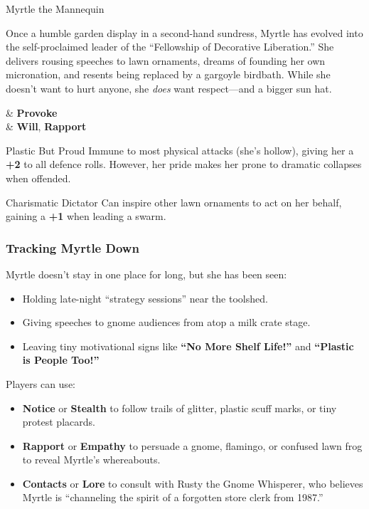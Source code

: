 \begin{NPC}[description={Plastic, Melodramatic, Revolutionary}]{Myrtle the Mannequin}

    Once a humble garden display in a second-hand sundress, Myrtle has evolved into the self-proclaimed leader of the “Fellowship of Decorative Liberation.” She delivers rousing speeches to lawn ornaments, dreams of founding her own micronation, and resents being replaced by a gargoyle birdbath. While she doesn’t want to hurt anyone, she \emph{does} want respect—and a bigger sun hat.

    \vspace{0.5\baselineskip}
    \begin{SkillsBox}
        \Skilled & \textbf{Provoke} \\
        \Novice  & \textbf{Will}, \textbf{Rapport}
    \end{SkillsBox}

    \begin{TraitsBox}
        \item[Plastic But Proud] Immune to most physical attacks (she’s hollow), giving her a \textbf{+2} to all defence rolls. However, her pride makes her prone to dramatic collapses when offended.
        \item[Charismatic Dictator] Can inspire other lawn ornaments to act on her behalf, gaining a \textbf{+1} when leading a swarm.
    \end{TraitsBox}

    \DamageBox[%
        totalfatigue=2,%
        totalmild=1,totalmoderate=0,totalsevere=0,%
    ]
\end{NPC}

\subsubsection{Tracking Myrtle Down}
Myrtle doesn’t stay in one place for long, but she has been seen:
\begin{itemize}
    \item Holding late-night “strategy sessions” near the toolshed.
    \item Giving speeches to gnome audiences from atop a milk crate stage.
    \item Leaving tiny motivational signs like \textbf{“No More Shelf Life!”} and \textbf{“Plastic is People Too!”}
\end{itemize}

Players can use:
\begin{itemize}
    \item \textbf{Notice} or \textbf{Stealth} to follow trails of glitter, plastic scuff marks, or tiny protest placards.
    \item \textbf{Rapport} or \textbf{Empathy} to persuade a gnome, flamingo, or confused lawn frog to reveal Myrtle’s whereabouts.
    \item \textbf{Contacts} or \textbf{Lore} to consult with Rusty the Gnome Whisperer, who believes Myrtle is “channeling the spirit of a forgotten store clerk from 1987.”
\end{itemize}

